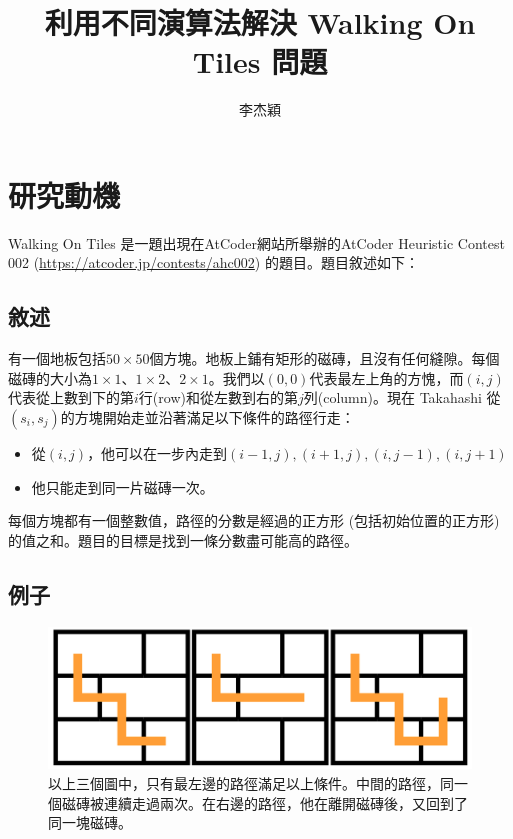 \documentclass[12pt, a4paper]{article}
\title{利用不同演算法解決 Walking On Tiles 問題}
\author{李杰穎}
\begin{document}
\maketitle

\section{研究動機}

Walking On Tiles 是一題出現在AtCoder網站所舉辦的AtCoder Heuristic Contest 002 (\url{https://atcoder.jp/contests/ahc002}) 的題目。題目敘述如下：

\subsection{敘述}
有一個地板包括$50 \times 50$個方塊。地板上鋪有矩形的磁磚，且沒有任何縫隙。每個磁磚的大小為$1 \times 1$、$1 \times 2$、$2 \times 1$。我們以$(0, 0)$代表最左上角的方愧，而$(i, j)$代表從上數到下的第$i$行(row)和從左數到右的第$j$列(column)。現在 Takahashi 從$(s_i, s_j)$的方塊開始走並沿著滿足以下條件的路徑行走：
\begin{itemize}
    \item 從$(i, j)$，他可以在一步內走到$(i-1, j), (i+1, j), (i, j-1), (i, j+ 1)$
    \item 他只能走到同一片磁磚一次。
\end{itemize}

每個方塊都有一個整數值，路徑的分數是經過的正方形 (包括初始位置的正方形) 的值之和。題目的目標是找到一條分數盡可能高的路徑。

\subsection{例子}

\begin{figure}[H]
    \centering
    \includegraphics[width=0.7\linewidth]{path.png}
    \caption{以上三個圖中，只有最左邊的路徑滿足以上條件。中間的路徑，同一個磁磚被連續走過兩次。在右邊的路徑，他在離開磁磚後，又回到了同一塊磁磚。}
\end{figure}
\end{document}
